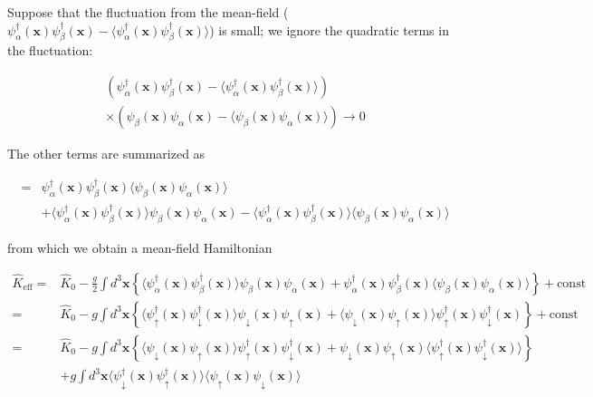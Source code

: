 Suppose that the fluctuation from the mean-field ($\psi^{\dagger}_{\alpha}(\bm{x})\psi^{\dagger}_{\beta}(\bm{x}) - \langle\psi^{\dagger}_{\alpha}(\bm{x})\psi^{\dagger}_{\beta}(\bm{x})\rangle$) is small; we ignore the quadratic terms in the fluctuation: 

\[\begin{split}
\left(\psi^{\dagger}_{\alpha}(\bm{x})\psi^{\dagger}_{\beta}(\bm{x}) - \langle\psi^{\dagger}_{\alpha}(\bm{x})\psi^{\dagger}_{\beta}(\bm{x})\rangle\right)\\
\times \left(\psi_{\beta}(\bm{x})\psi_{\alpha}(\bm{x}) - \langle\psi_{\beta}(\bm{x})\psi_{\alpha}(\bm{x})\rangle\right) \rightarrow 0\end{split}\]

The other terms are summarized as 

\[\begin{split}
 =&\psi^{\dagger}_{\alpha}(\bm{x})\psi^{\dagger}_{\beta}(\bm{x})\langle\psi_{\beta}(\bm{x})\psi_{\alpha}(\bm{x})\rangle\\
& + \langle\psi^{\dagger}_{\alpha}(\bm{x})\psi^{\dagger}_{\beta}(\bm{x})\rangle\psi_{\beta}(\bm{x})\psi_{\alpha}(\bm{x}) - \langle\psi^{\dagger}_{\alpha}(\bm{x})\psi^{\dagger}_{\beta}(\bm{x})\rangle\langle\psi_{\beta}(\bm{x})\psi_{\alpha}(\bm{x})\rangle \end{split} \]

from which we obtain a mean-field Hamiltonian 

\[\begin{split}\hat{K}_{\text{eff}} =& \hat{K}_0 - \frac{g}{2} \int d^3 \bm{x} \left\{\langle\psi^{\dagger}_{\alpha}(\bm{x})\psi^{\dagger}_{\beta}(\bm{x})\rangle\psi_{\beta}(\bm{x})\psi_{\alpha}(\bm{x}) +\psi^{\dagger}_{\alpha}(\bm{x})\psi^{\dagger}_{\beta}(\bm{x}) \langle\psi_{\beta}(\bm{x})\psi_{\alpha}(\bm{x})\rangle\right\} + \text{const}\\
=& \hat{K}_0 - g \int d^3 \bm{x} \left\{\langle\psi^{\dagger}_{\uparrow}(\bm{x})\psi^{\dagger}_{\downarrow}(\bm{x})\rangle\psi_{\downarrow}(\bm{x})\psi_{\uparrow}(\bm{x}) +\langle\psi_{\downarrow}(\bm{x})\psi_{\uparrow}(\bm{x})\rangle\psi^{\dagger}_{\uparrow}(\bm{x})\psi^{\dagger}_{\downarrow}(\bm{x}) \right\} + \text{const}\\
 =&\hat{K}_0 - g\int d^3\bm{x} \left\{\langle\psi_{\downarrow}(\bm{x})\psi_{\uparrow}(\bm{x})\rangle\psi^{\dagger}_{\uparrow}(\bm{x})\psi^{\dagger}_{\downarrow}(\bm{x}) +\psi_{\downarrow}(\bm{x})\psi_{\uparrow}(\bm{x})\langle\psi^{\dagger}_{\uparrow}(\bm{x})\psi^{\dagger}_{\downarrow}(\bm{x})\rangle \right\}\\
&+g\int d^3 \bm{x} \langle\psi^{\dagger}_{\downarrow}(\bm{x})\psi^{\dagger}_{\uparrow}(\bm{x})\rangle \langle\psi_{\uparrow}(\bm{x})\psi_{\downarrow}(\bm{x})\rangle
 \end{split}\]

